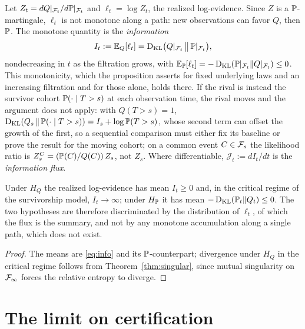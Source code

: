 \begin{definition}\label{def:info}
Let $Z_t=dQ|_{\mathcal{F}_t}/d\mathbb{P}|_{\mathcal{F}_t}$ and $\ell_t=\log Z_t$, the realized
log-evidence. Since $Z$ is a $\mathbb{P}$-martingale, $\ell_t$ is not monotone
along a path: new observations can favor $Q$, then $\mathbb{P}$. The monotone
quantity is the \emph{information}
\begin{equation}\label{eq:info}
I_t:=\mathbb{E}_Q[\ell_t]=\operatorname{D_{\mathrm{KL}}}\bigl(Q|_{\mathcal{F}_t}\,\big\|\,\mathbb{P}|_{\mathcal{F}_t}\bigr),
\end{equation}
nondecreasing in $t$ as the filtration grows, with
$\mathbb{E}_{\mathbb{P}}[\ell_t]=-\operatorname{D_{\mathrm{KL}}}(\mathbb{P}|_{\mathcal{F}_t}\|Q|_{\mathcal{F}_t})\le0$. This monotonicity, which the proposition asserts for fixed underlying laws and an increasing filtration and for those alone, holds there. If the rival is instead the survivor cohort $\mathbb{P}(\cdot \mid T > s)$ at each observation time, the rival moves and the argument does not apply: with $Q(T > s) = 1$, $\operatorname{D_{\mathrm{KL}}}(Q_s \,\|\, \mathbb{P}(\cdot \mid T > s)) = I_s + \log \mathbb{P}(T > s)$, whose second term can offset the growth of the first, so a sequential comparison must either fix its baseline or prove the result for the moving cohort; on a common event $C \in \mathcal{F}_s$ the likelihood ratio is $Z^{C}_s = (\mathbb{P}(C)/Q(C))\, Z_s$, not $Z_s$. Where differentiable,
$\mathcal J_t:=dI_t/dt$ is the \emph{information flux}.
\end{definition}

\begin{proposition}
\label{prop:discriminate}
Under $H_Q$ the realized log-evidence has mean $I_t\ge0$ and, in the
critical regime of the survivorship model, $I_t\to\infty$; under $H_{\mathbb{P}}$
it has mean $-\operatorname{D_{\mathrm{KL}}}(\mathbb{P}_t\|Q_t)\le0$. The two hypotheses are therefore
discriminated by the distribution of $\ell_t$, of which the flux is the
summary, and not by any monotone accumulation along a single path, which
does not exist.
\end{proposition}

\begin{proof}
The means are \eqref{eq:info} and its $\mathbb{P}$-counterpart; divergence under
$H_Q$ in the critical regime follows from Theorem~\ref{thm:singular},
since mutual singularity on $\mathcal{F}_\infty$ forces the relative entropy to
diverge.
\end{proof}

\section{The limit on certification}\label{sec:ceiling}

